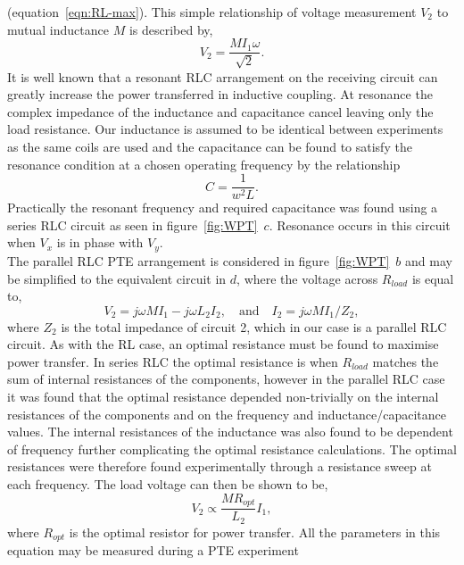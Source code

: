 \documentclass[11pt]{iopart}
\begin{document}
(equation~\ref{eqn:RL-max}). This simple relationship of voltage
measurement $V_2$ to mutual inductance $M$ is described by,
\begin{equation}
  V_2 = \frac{MI_1\omega}{\sqrt{2}}.
\label{eqn:MVs}
\end{equation}
It is well known that a resonant RLC arrangement on the receiving
circuit can greatly increase the power transferred in inductive
coupling\cite{Hirai2000}.  At resonance the complex impedance of the inductance
and capacitance cancel leaving only the load resistance. Our
inductance is assumed to be identical between experiments as the same
coils are used and the capacitance can be found to satisfy the
resonance condition at a chosen operating frequency by the
relationship
\begin{equation}
  C = \frac{1}{w^2L}.
  \label{eqn:RLC-res}
\end{equation}
Practically the resonant frequency and required capacitance was found
using a series RLC circuit as seen in
figure~\ref{fig:WPT}~$c$. Resonance occurs in this circuit when $V_x$
is in phase with $V_y$.\\
The parallel RLC PTE arrangement is considered in
figure~\ref{fig:WPT}~$b$ and may be simplified to the equivalent
circuit in $d$, where the voltage across $R_{load}$ is equal to,
\begin{equation}
 V_2 = j\omega MI_1 - j\omega L_2I_2,\quad\text{and}\quad
 I_2 = j\omega MI_1 / Z_2 ,
\end{equation}
where $Z_2$ is the total impedance of circuit 2, which in our case is
a parallel RLC circuit.  As with the RL case, an optimal resistance
must be found to
maximise power transfer. In series RLC the optimal resistance is when
$R_{load}$ matches the sum of internal resistances of the components,
however in the parallel RLC case it was found that the optimal
resistance depended non-trivially on the internal resistances of the
components and on the frequency and inductance/capacitance values. The
internal resistances of the inductance was also found to be dependent
of frequency further complicating the optimal resistance calculations.
The optimal resistances were therefore found experimentally
through a resistance sweep at each frequency.
The load voltage can then be shown to be,
\begin{equation}
    V_2 \propto \frac{MR_{opt}}{L_2}I_1,
\label{eqn:RLC-M}
\end{equation}
where $R_{opt}$ is the optimal resistor for power transfer. All the
parameters in this equation may be measured during a PTE experiment
\end{document}
